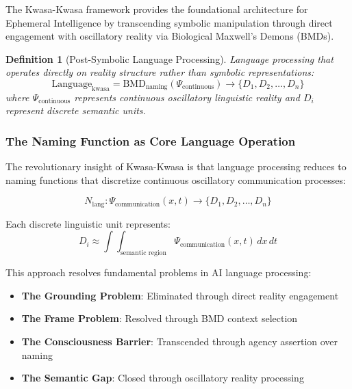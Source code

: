 \documentclass[12pt,a4paper]{article}
\newtheorem{definition}{Definition}
\begin{document}
The Kwasa-Kwasa framework provides the foundational architecture for Ephemeral Intelligence by transcending symbolic manipulation through direct engagement with oscillatory reality via Biological Maxwell's Demons (BMDs).

\begin{definition}[Post-Symbolic Language Processing]
Language processing that operates directly on reality structure rather than symbolic representations:
\begin{equation}
\text{Language}_{\text{kwasa}} = \text{BMD}_{\text{naming}}(\Psi_{\text{continuous}}) \rightarrow \{D_1, D_2, \ldots, D_n\}
\end{equation}
where $\Psi_{\text{continuous}}$ represents continuous oscillatory linguistic reality and $D_i$ represent discrete semantic units.
\end{definition}

\subsubsection{The Naming Function as Core Language Operation}

The revolutionary insight of Kwasa-Kwasa is that language processing reduces to naming functions that discretize continuous oscillatory communication processes:

\begin{equation}
N_{\text{lang}}: \Psi_{\text{communication}}(x,t) \rightarrow \{D_1, D_2, \ldots, D_n\}
\end{equation}

Each discrete linguistic unit represents:
\begin{equation}
D_i \approx \int\int_{\text{semantic region}} \Psi_{\text{communication}}(x,t) \, dx \, dt
\end{equation}

This approach resolves fundamental problems in AI language processing:
\begin{itemize}
\item \textbf{The Grounding Problem}: Eliminated through direct reality engagement
\item \textbf{The Frame Problem}: Resolved through BMD context selection
\item \textbf{The Consciousness Barrier}: Transcended through agency assertion over naming
\item \textbf{The Semantic Gap}: Closed through oscillatory reality processing
\end{itemize}
\end{document}

